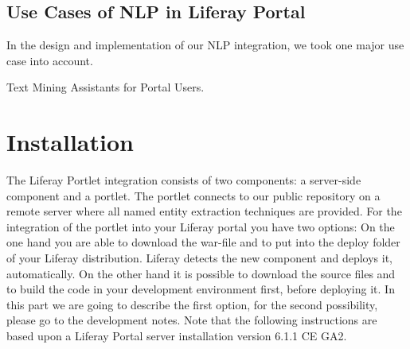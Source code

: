 \subsection{Use Cases of NLP in Liferay Portal}
In the design and implementation of our NLP integration, we took one major use case into account.

\begin{description}
\item[Text Mining Assistants for Portal Users.] 

\end{description}

\noindent

\section{Installation}
The Liferay Portlet integration consists of two components: a server-side component and a portlet. The portlet connects to our public repository on a remote server where all named entity extraction techniques are provided. For the integration of the \sa portlet into your Liferay portal you have two options: On the one hand you are able to download the war-file and to put into the deploy folder of your Liferay distribution. Liferay detects the new component and deploys it, automatically. On the other hand it is possible to download the source files and to build the code in your development environment first, before deploying it. In this part we are going to describe the first option, for the second possibility, please go to the development notes. Note that the following instructions are based upon a Liferay Portal server installation version 6.1.1 CE GA2. 


